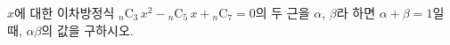\hspace*{2mm}\begin{minipage}[t]{\dimexpr\linewidth-2mm\relax}\vspace{0pt}
$x$에 대한 이차방정식 ${}_n\mathrm{C}_3\,x^2-{}_n\mathrm{C}_5\,x+{}_n\mathrm{C}_7=0$의 두 근을 $\alpha$, $\beta$라 하면 $\alpha+\beta=1$일 때, $\alpha\beta$의 값을 구하시오. \end{minipage}
